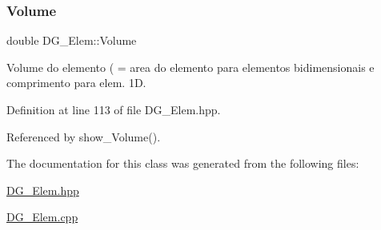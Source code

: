 \subsubsection{\texorpdfstring{Volume}{Volume}}
{\footnotesize\ttfamily double D\+G\+\_\+\+Elem\+::\+Volume\hspace{0.3cm}{\ttfamily [private]}}



Volume do elemento ( = area do elemento para elementos bidimensionais e comprimento para elem. 1D. 



Definition at line 113 of file D\+G\+\_\+\+Elem.\+hpp.



Referenced by show\+\_\+\+Volume().



The documentation for this class was generated from the following files\+:\begin{DoxyCompactItemize}
\item 
\hyperlink{DG__Elem_8hpp}{D\+G\+\_\+\+Elem.\+hpp}\item 
\hyperlink{DG__Elem_8cpp}{D\+G\+\_\+\+Elem.\+cpp}\end{DoxyCompactItemize}
